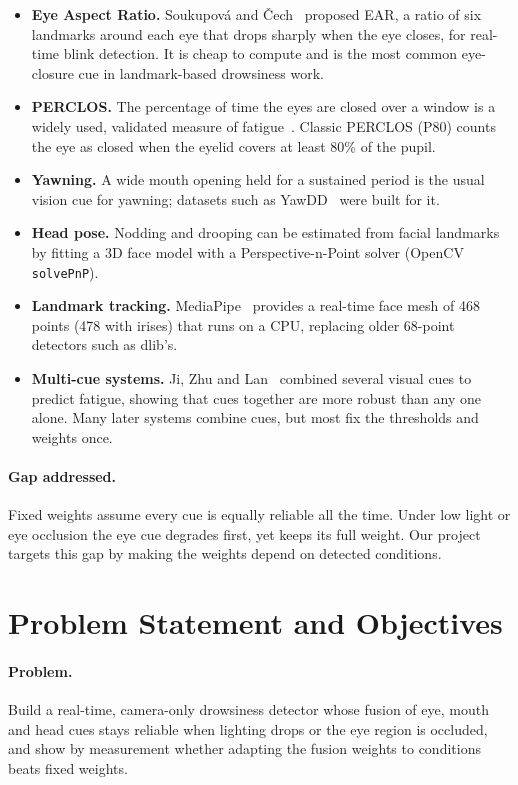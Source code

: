 \documentclass[12pt,a4paper]{article}
\newcommand{\code}[1]{\texttt{#1}}
\begin{document}
\begin{itemize}
\item \textbf{Eye Aspect Ratio.} Soukupov\'a and \v{C}ech~\cite{ear} proposed EAR, a ratio of six landmarks around each eye that drops sharply when the eye closes, for real-time blink detection. It is cheap to compute and is the most common eye-closure cue in landmark-based drowsiness work.
\item \textbf{PERCLOS.} The percentage of time the eyes are closed over a window is a widely used, validated measure of fatigue~\cite{perclos,ji}. Classic PERCLOS (P80) counts the eye as closed when the eyelid covers at least 80\% of the pupil.
\item \textbf{Yawning.} A wide mouth opening held for a sustained period is the usual vision cue for yawning; datasets such as YawDD~\cite{yawdd} were built for it.
\item \textbf{Head pose.} Nodding and drooping can be estimated from facial landmarks by fitting a 3D face model with a Perspective-n-Point solver (OpenCV \code{solvePnP}).
\item \textbf{Landmark tracking.} MediaPipe~\cite{mediapipe} provides a real-time face mesh of 468 points (478 with irises) that runs on a CPU, replacing older 68-point detectors such as dlib's.
\item \textbf{Multi-cue systems.} Ji, Zhu and Lan~\cite{ji} combined several visual cues to predict fatigue, showing that cues together are more robust than any one alone. Many later systems combine cues, but most fix the thresholds and weights once.
\end{itemize}

\paragraph{Gap addressed.} Fixed weights assume every cue is equally reliable all the time. Under low light or eye occlusion the eye cue degrades first, yet keeps its full weight. Our project targets this gap by making the weights depend on detected conditions.

\section{Problem Statement and Objectives}

\paragraph{Problem.} Build a real-time, camera-only drowsiness detector whose fusion of eye, mouth and head cues stays reliable when lighting drops or the eye region is occluded, and show by measurement whether adapting the fusion weights to conditions beats fixed weights.
\end{document}
